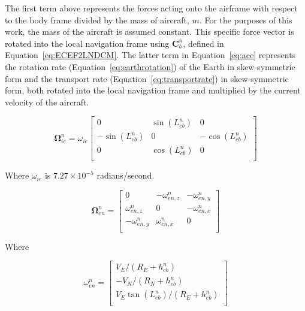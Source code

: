 The first term above represents the forces acting onto the airframe with respect to the body frame divided by the mass of aircraft, \(m\). For the purposes of this work, the mass of the aircraft is assumed constant. This specific force vector is rotated into the local navigation frame using \(\mathbf{C}_b^n\), defined in Equation~\ref{eq:ECEF2LNDCM}. The latter term in Equation~\ref{eq:acc} represents the rotation rate (Equation~\ref{eq:earthrotation}) of the Earth in skew-symmetric form and the transport rate (Equation~\ref{eq:transportrate}) in skew-symmetric form, both rotated into the local navigation frame and multiplied by the current velocity of the aircraft.

\begin{equation}\label{eq:earthrotation}
    \mathbf{\Omega}_{ie}^n =
    \omega_{ie}\begin{bmatrix}
        0                          & \sin\left(L_{eb}^n\right) & 0                          \\
        -\sin\left(L_{eb}^n\right) & 0                         & -\cos\left(L_{eb}^n\right) \\
        0                          & \cos\left(L_{eb}^n\right) & 0                          \\
    \end{bmatrix}
\end{equation}

Where \(\omega_{ie}\) is \(7.27\times10^{-5}\) radians/second.

\begin{equation}\label{eq:transportrate}
    \mathbf{\Omega}_{en}^n = \begin{bmatrix}
        0                & -\omega_{en,z}^n & -\omega_{en,y}^n \\
        \omega_{en,z}^n  & 0                & -\omega_{en,x}^n \\
        -\omega_{en,y}^n & \omega_{en,x}^n  & 0                \\
    \end{bmatrix}
\end{equation}

Where

\begin{equation}\label{eq:omega_en_n}
    \omega_{en}^n =
    \begin{bmatrix}
        V_E/(R_E + h_{eb}^n)               \\
        -V_N/(R_N + h_{eb}^n)              \\
        V_E\tan(L_{eb}^n)/(R_E + h_{eb}^n) \\
    \end{bmatrix}
\end{equation}

